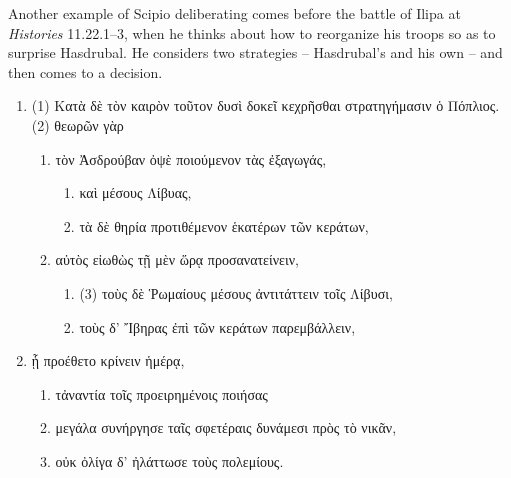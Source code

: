 \documentclass[12pt,letterpaper,oneside,final]{memoir}
\begin{document}
Another example of Scipio deliberating comes before the battle of Ilipa at \emph{Histories} 11.22.1--3, when he thinks about how to reorganize his troops so as to surprise Hasdrubal. He considers two strategies -- Hasdrubal's and his own -- and then comes to a decision. \begin{greek} 
\begin{enumerate} \SingleSpacing 
\item (1) Κατὰ δὲ τὸν καιρὸν τοῦτον δυσὶ δοκεῖ κεχρῆσθαι στρατηγήμασιν ὁ Πόπλιος. (2) θεωρῶν γὰρ 
  \begin{enumerate}
  \item τὸν Ἀσδρούβαν ὀψὲ ποιούμενον τὰς ἐξαγωγάς, 
    \begin{enumerate}
    \item καὶ μέσους Λίβυας, 
    \item τὰ δὲ θηρία προτιθέμενον ἑκατέρων τῶν κεράτων,
    \end{enumerate}
  \item αὐτὸς εἰωθὼς τῇ μὲν ὥρᾳ προσανατείνειν, 
    \begin{enumerate}
    \item (3) τοὺς δὲ Ῥωμαίους μέσους ἀντιτάττειν τοῖς Λίβυσι,
    \item τοὺς δ' Ἴβηρας ἐπὶ τῶν κεράτων παρεμβάλλειν,
    \end{enumerate}
  \end{enumerate}
\item ᾗ προέθετο κρίνειν ἡμέρᾳ, 
  \begin{enumerate}
  \item τἀναντία τοῖς προειρημένοις ποιήσας 
  \item μεγάλα συνήργησε ταῖς σφετέραις δυνάμεσι πρὸς τὸ νικᾶν, 
  \item οὐκ ὀλίγα δ' ἠλάττωσε τοὺς πολεμίους.
  \end{enumerate}
\end{enumerate} \DoubleSpacing \end{greek} 
\end{document}
